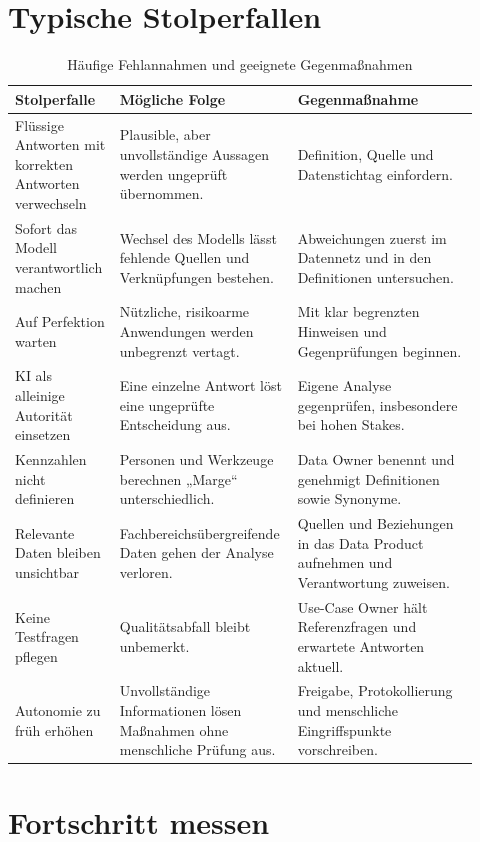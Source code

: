 \documentclass[a4paper,12pt,twoside]{report}
\theoremstyle{definition}
\begin{document}
\chapter{Typische Stolperfallen}
\label{sec:pitfalls}

\begin{table}[htbp]
\centering
\small
\caption{Häufige Fehlannahmen und geeignete Gegenmaßnahmen}
\label{tab:pitfalls}
\begin{tabular}{p{0.22\linewidth}p{0.32\linewidth}p{0.38\linewidth}}
\toprule
\textbf{Stolperfalle} & \textbf{Mögliche Folge} & \textbf{Gegenmaßnahme} \\
\midrule
Flüssige Antworten mit korrekten Antworten verwechseln & Plausible, aber unvollständige Aussagen werden ungeprüft übernommen. & Definition, Quelle und Datenstichtag einfordern. \\
Sofort das Modell verantwortlich machen & Wechsel des Modells lässt fehlende Quellen und Verknüpfungen bestehen. & Abweichungen zuerst im Datennetz und in den Definitionen untersuchen. \\
Auf Perfektion warten & Nützliche, risikoarme Anwendungen werden unbegrenzt vertagt. & Mit klar begrenzten Hinweisen und Gegenprüfungen beginnen. \\
KI als alleinige Autorität einsetzen & Eine einzelne Antwort löst eine ungeprüfte Entscheidung aus. & Eigene Analyse gegenprüfen, insbesondere bei hohen Stakes. \\
Kennzahlen nicht definieren & Personen und Werkzeuge berechnen „Marge“ unterschiedlich. & Data Owner benennt und genehmigt Definitionen sowie Synonyme. \\
Relevante Daten bleiben unsichtbar & Fachbereichsübergreifende Daten gehen der Analyse verloren. & Quellen und Beziehungen in das Data Product aufnehmen und Verantwortung zuweisen. \\
Keine Testfragen pflegen & Qualitätsabfall bleibt unbemerkt. & Use-Case Owner hält Referenzfragen und erwartete Antworten aktuell. \\
Autonomie zu früh erhöhen & Unvollständige Informationen lösen Maßnahmen ohne menschliche Prüfung aus. & Freigabe, Protokollierung und menschliche Eingriffspunkte vorschreiben. \\
\bottomrule
\end{tabular}
\end{table}

\chapter{Fortschritt messen}
\label{sec:metrics}
\end{document}
